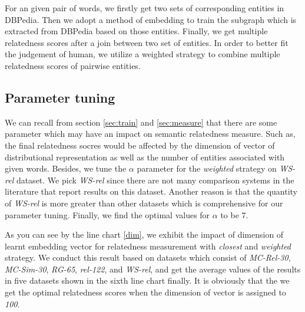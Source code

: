 For an given pair of words, we firstly get two sets of corresponding entities in DBPedia. 
Then we adopt a method of embedding to train the subgraph which is extracted from DBPedia
based on those entities. Finally,  we get multiple relatedness scores after
a join between two set of entities. In order to better fit the judgement of human, we utilize a
weighted strategy to combine multiple relatedness scores of pairwise entities.

\subsection{Parameter tuning}
We can recall from section \ref{sec:train} and \ref{sec:measure} that there are some parameter
which may have an impact on semantic relatedness measure. Such as, the final relatedness
socres would be affected by the dimension of vector of distributional representation
as well as the number of entities associated with given words.
Besides, we tune the $\alpha$ parameter for the \emph{weighted} strategy on \emph{WS-rel} dataset.
We pick \emph{WS-rel} since there are not many comparison systems in the literature that
report results on this dataset. Another reason is that the quantity of \emph{WS-rel} is more
greater than other datasets which is comprehensive for our parameter tuning.
Finally, we find the optimal values for $\alpha$ to be 7.


As you can see by the line chart \ref{dim}, we exhibit the impact of dimension of learnt embedding
vector for relatedness measurement with \emph{closest} and \emph{weighted} strategy. 
We conduct this result based on datasets which consist of
\emph{MC-Rel-30}, \emph{MC-Sim-30}, \emph{RG-65}, \emph{rel-122}, and \emph{WS-rel}, and get the 
average values of the results in five datasets shown in the sixth line chart finally. It is obviously
that the we get the optimal relatedness scores when the dimension of vector is assigned to \emph{100}.

